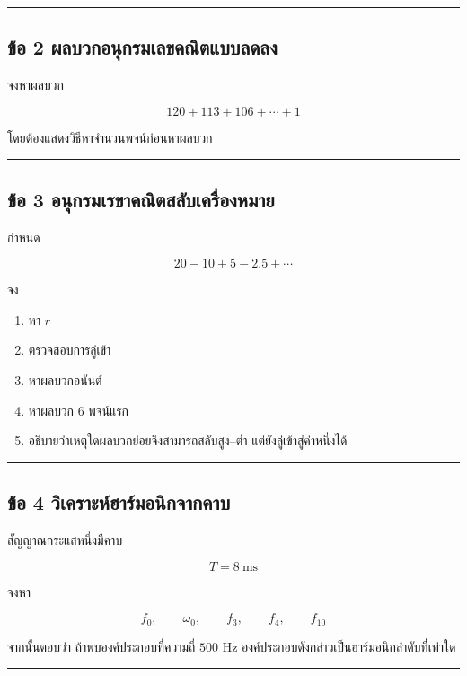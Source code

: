 \par\noindent\rule{\textwidth}{0.4pt}\par

\subsection{ข้อ 2 ผลบวกอนุกรมเลขคณิตแบบลดลง}

จงหาผลบวก

\[
120+113+106+\cdots+1
\]

โดยต้องแสดงวิธีหาจำนวนพจน์ก่อนหาผลบวก

\par\noindent\rule{\textwidth}{0.4pt}\par

\subsection{ข้อ 3 อนุกรมเรขาคณิตสลับเครื่องหมาย}

กำหนด

\[
20-10+5-2.5+\cdots
\]

จง

\begin{enumerate}
    \item หา \(r\)
    \item ตรวจสอบการลู่เข้า
    \item หาผลบวกอนันต์
    \item หาผลบวก 6 พจน์แรก
    \item อธิบายว่าเหตุใดผลบวกย่อยจึงสามารถสลับสูง–ต่ำ แต่ยังลู่เข้าสู่ค่าหนึ่งได้
\end{enumerate}

\par\noindent\rule{\textwidth}{0.4pt}\par

\subsection{ข้อ 4 วิเคราะห์ฮาร์มอนิกจากคาบ}

สัญญาณกระแสหนึ่งมีคาบ

\[
T=8\ \text{ms}
\]

จงหา

\[
f_0,\qquad \omega_0,\qquad f_3,\qquad f_4,\qquad f_{10}
\]

จากนั้นตอบว่า ถ้าพบองค์ประกอบที่ความถี่ \(500\text{ Hz}\) องค์ประกอบดังกล่าวเป็นฮาร์มอนิกลำดับที่เท่าใด

\par\noindent\rule{\textwidth}{0.4pt}\par

